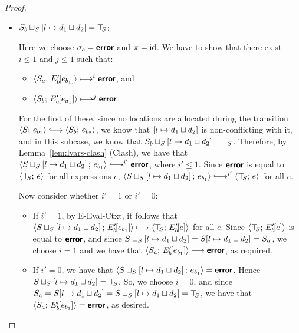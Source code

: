 \begin{proof}
\begin{enumerate}
\begin{enumerate}
\begin{itemize}
      \item
        $S_b \sqcup_{S} \left[ l \mapsto d_1 \sqcup d_2 \right]
        = \top\hspace{-0.85mm}_{S}$:

        Here we choose $\sigma_c = \textbf{\textsf{error}}$ and $\pi = \mathrm{id}$.  We have to
        show that there exist $i \leq 1$ and $j \leq 1$ such that:
        \begin{itemize}
        \item $\langle S_a;\, E'_b\hspace{-1mm}\left[e_{b_1}\right] \rangle \longmapsto^i
          \textbf{\textsf{error}}$, and
        \item
          $\langle S_b;\, E'_a\hspace{-1mm}\left[e_{a_1}\right] \rangle \longmapsto^j \textbf{\textsf{error}}$.
        \end{itemize}

        For the first of these, since no locations are allocated
        during the transition $\config{S}{e_{b_1}} \parstepsto
        \config{S_b}{e_{b_2}}$, we know that
        $\left[ l \mapsto d_1 \sqcup d_2 \right]$ is
        non-conflicting with it, and in this subcase, we know that
        $S_b \sqcup_{S} \left[ l \mapsto d_1 \sqcup d_2 \right]
        = \top\hspace{-0.85mm}_{S}$.  Therefore, by Lemma~\ref{lem:lvars-clash} (Clash),
        we have that
        $\config{\lubstore{S}{\store{\storebindingRaw{l}{\userlub{d_1}{d_2}}}}}{e_{b_1}}
        \parstepsto^{i'} \error$, where $i' \leq 1$.  Since $\textbf{\textsf{error}}$ is
        equal to $\langle \top\hspace{-0.85mm}_{S};\, e \rangle$ for all expressions $e$,
        $\config{\lubstore{S}{\store{\storebindingRaw{l}{\userlub{d_1}{d_2}}}}}{e_{b_1}}
        \parstepsto^{i'} \config{\topS}{e}$ for all $e$.

        Now consider whether $i' = 1$ or $i' = 0$:
        \begin{itemize}
          \item If $i' = 1$, by {\sc E-Eval-Ctxt}, it follows that
            $\langle S \sqcup_{S} \left[ l \mapsto d_1 \sqcup d_2 \right];\, E'_b\hspace{-1mm}\left[e_{b_1}\right] \rangle
            \longmapsto \langle \top\hspace{-0.85mm}_{S};\, E'_b\hspace{-1mm}\left[e\right] \rangle$ for all
            $e$.  Since $\langle \top\hspace{-0.85mm}_{S};\, E'_b\hspace{-1mm}\left[e\right] \rangle$ is equal
            to $\textbf{\textsf{error}}$, and since
            $S \sqcup_{S} \left[ l \mapsto d_1 \sqcup d_2 \right]
            = S[l \mapsto d_1 \sqcup d_2] = S_a$, we choose $i
            = 1$ and we have that
            $\langle S_a;\, E'_b\hspace{-1mm}\left[e_{b_1}\right] \rangle \longmapsto
            \textbf{\textsf{error}}$, as required.

          \item If $i' = 0$, we have that
            $\langle S \sqcup_{S} \left[ l \mapsto d_1 \sqcup d_2 \right];\, e_{b_1} \rangle
            = \textbf{\textsf{error}}$.  Hence
            $S \sqcup_{S} \left[ l \mapsto d_1 \sqcup d_2 \right]
            = \top\hspace{-0.85mm}_{S}$.  So, we choose $i = 0$, and since $S_a =
            S[l \mapsto d_1 \sqcup d_2] =
            S \sqcup_{S} \left[ l \mapsto d_1 \sqcup d_2 \right]
            = \top\hspace{-0.85mm}_{S}$, we have that
            $\langle S_a;\, E'_b\hspace{-1mm}\left[e_{b_1}\right] \rangle = \textbf{\textsf{error}}$, as
            desired.
        \end{itemize}


\end{itemize}
\end{enumerate}
\end{enumerate}
\end{proof}
